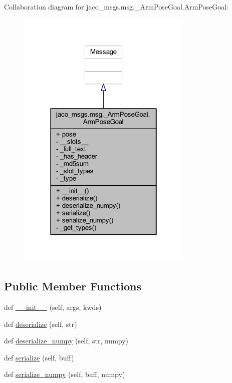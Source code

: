 Collaboration diagram for jaco\+\_\+msgs.\+msg.\+\_\+\+Arm\+Pose\+Goal.\+Arm\+Pose\+Goal\+:
\nopagebreak
\begin{figure}[H]
\begin{center}
\leavevmode
\includegraphics[width=238pt]{d9/dd4/classjaco__msgs_1_1msg_1_1__ArmPoseGoal_1_1ArmPoseGoal__coll__graph}
\end{center}
\end{figure}
\subsection*{Public Member Functions}
\begin{DoxyCompactItemize}
\item 
def \hyperlink{classjaco__msgs_1_1msg_1_1__ArmPoseGoal_1_1ArmPoseGoal_a5ac1bb131e60fcd9fc01cc39ce4342c6}{\+\_\+\+\_\+init\+\_\+\+\_\+} (self, args, kwds)
\item 
def \hyperlink{classjaco__msgs_1_1msg_1_1__ArmPoseGoal_1_1ArmPoseGoal_a5e943ea5b1dc04bb30487e5397a26e29}{deserialize} (self, str)
\item 
def \hyperlink{classjaco__msgs_1_1msg_1_1__ArmPoseGoal_1_1ArmPoseGoal_a9ec47f02e84e07468afdaa72760944e8}{deserialize\+\_\+numpy} (self, str, numpy)
\item 
def \hyperlink{classjaco__msgs_1_1msg_1_1__ArmPoseGoal_1_1ArmPoseGoal_a5afb5ada8d321855cdd138f90ace6cd7}{serialize} (self, buff)
\item 
def \hyperlink{classjaco__msgs_1_1msg_1_1__ArmPoseGoal_1_1ArmPoseGoal_a77ce48bbc5c95a3c606ce98884cc1988}{serialize\+\_\+numpy} (self, buff, numpy)
\end{DoxyCompactItemize}
